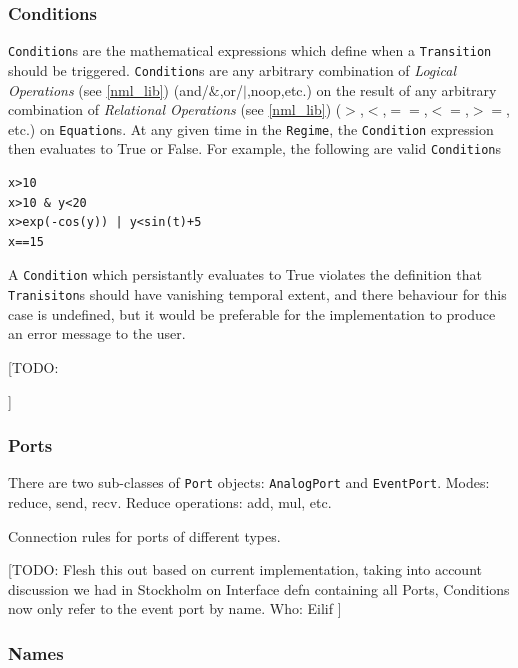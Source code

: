 \documentclass[a4paper]{article}
\newcommand\nmlClass[1]{{\tt #1}}
\begin{document}

\subsubsection{Conditions}

\nmlClass{Condition}s are the mathematical expressions which define
when a \nmlClass{Transition} should be triggered.
\nmlClass{Condition}s are any arbitrary combination of \emph{Logical
  Operations} (see \ref{nml_lib}) (and/$\&$,or/$|$,noop,etc.) on the
result of any arbitrary combination of \emph{Relational Operations}
(see \ref{nml_lib}) ($>$,$<$,$==$,$<=$,$>=$, etc.) on \nmlClass{Equation}s.  At
any given time in the \nmlClass{Regime}, the \nmlClass{Condition}
expression then evaluates to True or False.  For example, the
following are valid \nmlClass{Condition}s

\begin{lstlisting}[style=display]
x>10
x>10 & y<20
x>exp(-cos(y)) | y<sin(t)+5
x==15
\end{lstlisting}

A \nmlClass{Condition} which persistantly evaluates to True
violates the definition that \nmlClass{Tranisiton}s should have vanishing
temporal extent, and there behaviour for this case is undefined, but
it would be preferable for the implementation to produce an error
message to the user.

[TODO:


]


\subsubsection{Ports}

There are two sub-classes of \nmlClass{Port} objects: \nmlClass{AnalogPort} and \nmlClass{EventPort}.
Modes: reduce, send, recv.
Reduce operations: add, mul, etc.

Connection rules for ports of different types.

[TODO:
Flesh this out based on current implementation, taking into account
discussion we had in Stockholm on Interface defn containing all Ports,
Conditions now only refer to the event port by name.
Who: Eilif
]


\subsubsection{Names}
\end{document}
